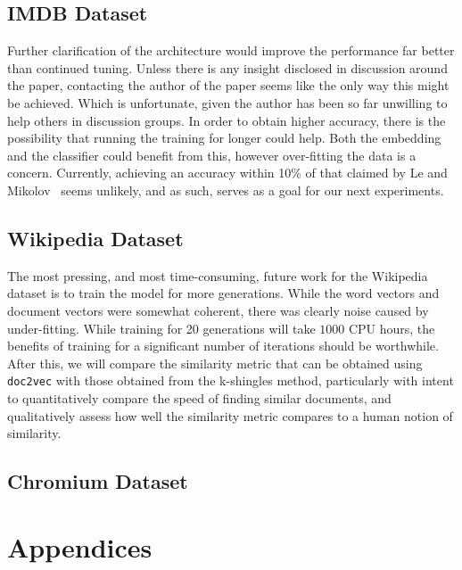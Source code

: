 \documentclass[11pt]{article}
\begin{document}
  \subsection*{IMDB Dataset}
    Further clarification of the architecture would improve the performance far better
    than continued tuning. Unless there is any insight disclosed in discussion around
    the paper, contacting the author of the paper seems like the only way this might be
    achieved. Which is unfortunate, given the author has been so far unwilling to
    help others in discussion groups.
    In order to obtain higher accuracy, there is the possibility that running the
    training for longer could help. Both the embedding and the classifier could benefit
    from this, however over-fitting the data is a concern.
    Currently, achieving an accuracy within 10\% of that claimed by Le
    and Mikolov~\cite{le2014distributed} seems unlikely, and as such, serves as
    a goal for our next experiments.

  \subsection*{Wikipedia Dataset}
    The most pressing, and most time-consuming, future work for the Wikipedia dataset
    is to train the model for more generations. While the word vectors and document
    vectors were somewhat coherent, there was clearly noise caused by under-fitting.
    While training for 20 generations will take $1000$ CPU hours, the benefits of
    training for a significant number of iterations should be worthwhile.\\
    After this, we will compare the similarity metric that can be obtained using
    \texttt{doc2vec} with those obtained from the k-shingles method, particularly
    with intent to quantitatively compare the speed of finding similar documents, and
    qualitatively assess how well the similarity metric compares to a human notion of
    similarity.

  \subsection*{Chromium Dataset}

\newpage

\printbibliography

\section*{Appendices}
\end{document}
